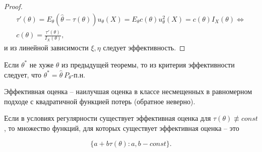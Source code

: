 \begin{proof}
\begin{gather*}
\tau '( \theta ) =E_{\theta }(\hat{\theta } -\tau ( \theta )) u_{\theta }( X) =E_{\theta } c( \theta ) u_{\theta }^{2}( X) =c( \theta ) I_{X}( \theta ) \Leftrightarrow \\
c( \theta ) =\frac{\tau '( \theta )}{I_{X}( \theta )} ,
\end{gather*}
и из линейной зависимости $\displaystyle \xi ,\eta $ следует эффективность.
\end{proof}
\begin{corollary}
Если $\displaystyle \theta ^{*}$ не хуже $\displaystyle \theta $ из предыдущей теоремы, то из критерия эффективности следует, что $\displaystyle \theta ^{*} =\hat{\theta } \ P_{\theta }$-п.н.
\end{corollary}
\begin{note}
Эффективная оценка -- наилучшая оценка в классе несмещенных в равномерном подходе с квадратичной функцией потерь (обратное неверно).
\end{note}
\begin{theorem}
Если в условиях регулярности существует эффективная оценка для $\displaystyle \tau ( \theta ) \nequiv const$, то множество функций, для которых существует эффективная оценка -- это


\begin{equation*}
\{a+b\tau ( \theta ) :a,b-const\} .
\end{equation*}
\end{theorem}
